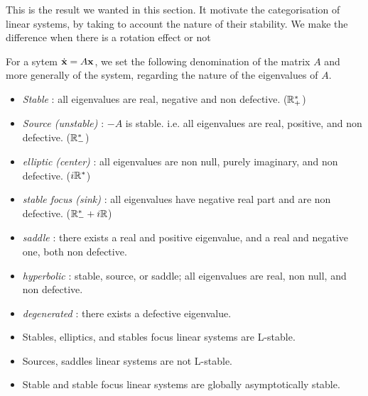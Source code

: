 This is the result we wanted in this section. It motivate the categorisation of linear systems, by taking to account the nature of their stability. We make the difference when there is a rotation effect or not
\begin{definition}
    For a sytem $\dot{\mathbf{x}}=A\mathbf{x}$, we set the following denomination of the matrix $A$ and more generally of the system, regarding the nature of the eigenvalues of $A$.
    \begin{itemize}
    \item \emph{Stable} : all eigenvalues are real, negative and non defective. ($\mathbb{R}^*_+$)
    \item \emph{Source (unstable)} : $-A$ is stable. i.e. all eigenvalues are real, positive, and non defective. ($\mathbb{R}^*_-$)
    \item \emph{elliptic (center)} : all eigenvalues are non null, purely imaginary, and non defective. ($i\mathbb{R}^*$)
    \item \emph{stable focus (sink)} : all eigenvalues have negative real part and are non defective. ($\mathbb{R}^*_-+i\mathbb{R}$)
    \item \emph{saddle} : there exists a real and positive eigenvalue, and a real and negative one, both non defective.
    \item \emph{hyperbolic} : stable, source, or saddle; \ie all eigenvalues are real, non null, and non defective.
    \item \emph{degenerated} : there exists a defective eigenvalue.
    \end{itemize}
\end{definition}
\begin{corollaire}
\quad
\begin{itemize} 
    \item Stables, elliptics, and stables focus linear systems are L-stable.
    \item Sources, saddles linear systems are not L-stable.
    \item Stable and stable focus linear systems are globally asymptotically stable.
    \end{itemize} 
\end{corollaire}

